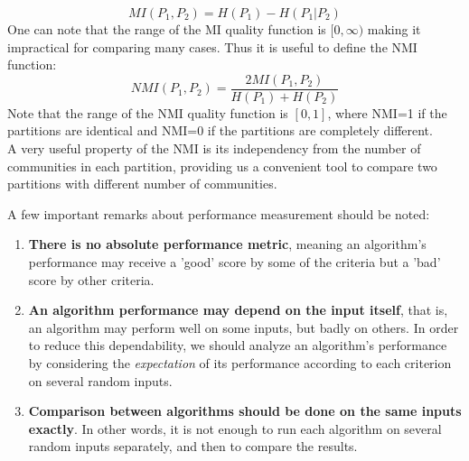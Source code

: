 \begin{itemize}
\begin{equation}
\label{eqn:MI}
MI(P_{1},P_{2}) = H(P_{1})-H(P_{1}|P_{2})
\end{equation}
One can note that the range of the \acrshort{MI} quality function is $[0,\infty)$ making it impractical for comparing many cases. Thus it is useful to define the \acrshort{NMI} function:
\begin{equation}
\label{eqn:NMI}
NMI(P_{1},P_{2})= \frac{2MI(P_{1},P_{2})}{H(P_{1})+H(P_{2})}
\end{equation} 
Note that the range of the \acrshort{NMI} quality function is $[0,1]$, where \acrshort{NMI}=1 if the partitions are identical and \acrshort{NMI}=0 if the partitions are completely different.\\
A very useful property of the \acrshort{NMI} is its independency from the number of communities in each partition, providing us a convenient tool to compare two partitions with different number of communities.

\end{itemize}
A few important remarks about performance measurement should be noted:
\begin{enumerate}

\item \textbf{There is no absolute performance metric}, meaning
an algorithm's performance may receive a 'good' score by some of the criteria but a 'bad' score by other criteria.

\item \textbf{An algorithm performance may depend on the input itself}, that is, an algorithm may perform well on some inputs, but badly on others. In order to reduce this dependability, we should analyze an algorithm's performance by considering the \textit{expectation} of its performance according to each criterion on several random inputs.

\item \textbf{Comparison between algorithms should be done on the same inputs exactly}. In other words, it is not enough to run each algorithm on several random inputs separately, and then to compare the results.

\end{enumerate}

\vspace{10pt}

